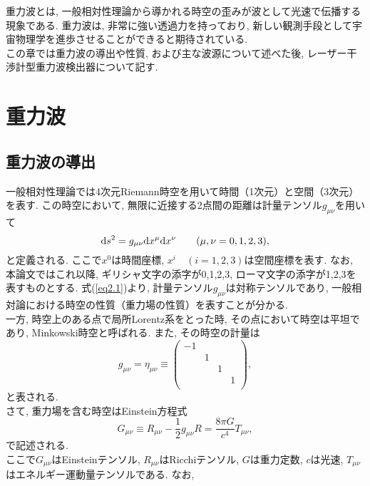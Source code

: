重力波とは, 一般相対性理論から導かれる時空の歪みが波として光速で伝播する現象である. 重力波は, 非常に強い透過力を持っており, 新しい観測手段として宇宙物理学を進歩させることができると期待されている. \\
\quad この章では重力波の導出や性質, および主な波源について述べた後, レーザー干渉計型重力波検出器について記す. 
\section{重力波}
\subsection{重力波の導出}
\renewcommand{\thefootnote}{\arabic{footnote}}
一般相対性理論では4次元Riemann時空を用いて時間（1次元）と空間（3次元）を表す. この時空において, 無限に近接する2点間の距離は計量テンソル$g_{\mu\nu}$を用いて
\begin{equation}
{\rm d}s^{2}=g_{\mu\nu}{\rm d}x^{\mu}{\rm d}x^{\nu}\qquad(\mu,\nu=0,1,2,3),
\label{eq2.1}
\end{equation}
と定義される. ここで$x^0$は時間座標, $x^i\quad(i=1,2,3)$は空間座標を表す. なお, 本論文ではこれ以降, ギリシャ文字の添字が0,1,2,3, ローマ文字の添字が1,2,3を表すものとする. 式(\ref{eq2.1})より, 計量テンソル$g_{\mu\nu}$は対称テンソルであり, 一般相対論における時空の性質（重力場の性質）を表すことが分かる. \\
\quad 一方, 時空上のある点で局所Lorentz系をとった時, その点において時空は平坦であり, Minkowski時空と呼ばれる. また, その時空の計量は
\begin{equation}
g_{\mu\nu}=\eta_{\mu\nu}\equiv
\begin{pmatrix}
-1 &   &   &  \\
   & 1 &   &  \\
   &   & 1 &  \\
   &   &   & 1\\
\end{pmatrix},
\label{eq2.2}
\end{equation}
と表される. \\
\quad さて, 重力場を含む時空はEinstein方程式
\begin{equation}
G_{\mu\nu}\equiv R_{\mu\nu}-\frac{1}{2}g_{\mu\nu}R=\frac{8\pi G}{c^4}T_{\mu\nu},
\label{eq2.3}
\end{equation}
で記述される. \\
\quad ここで$G_{\mu\nu}$はEinsteinテンソル, $R_{\mu\nu}$はRicchiテンソル, $G$は重力定数, $c$は光速, $T_{\mu\nu}$はエネルギー運動量テンソルである. なお, 
